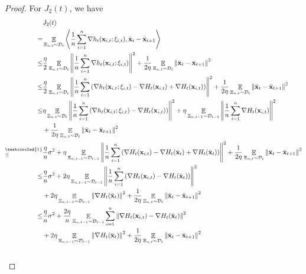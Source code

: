 \documentclass{article}
\begin{document}
\begin{proof}
For $J_2(t)$, we have
\begin{align}
\nonumber
& J_2(t) \\ \nonumber 
= & \EE_{ \Xi_{n,t} \sim \Dcal_{t} }\lrangle{\frac{1}{n}\sum_{i=1}^n\nabla h_t(\x_{i,t};\xi_{i,t}), \bar{\x}_t - \bar{\x}_{t+1} } \\ \nonumber
\le & \frac{\eta}{2}\EE_{ \Xi_{n,t} \sim \Dcal_{t} } \lrnorm{\frac{1}{n}\sum_{i=1}^n \nabla h_t(\x_{i,t};\xi_{i,t})}^2 + \frac{1}{2\eta} \EE_{ \Xi_{n,t} \sim \Dcal_{t} }\lrnorm{ \bar{\x}_t - \bar{\x}_{t+1}}^2  \\ \nonumber
\le & \frac{\eta}{2}\EE_{ \Xi_{n,t} \sim \Dcal_{t} }\lrnorm{\frac{1}{n}\sum_{i=1}^n \lrincir{\nabla  h_t(\x_{i,t};\xi_{i,t}) - \nabla H_t(\x_{i,t}) + \nabla H_t(\x_{i,t})} }^2 + \frac{1}{2\eta} \EE_{ \Xi_{n,t} \sim \Dcal_{t} }\lrnorm{ \bar{\x}_t - \bar{\x}_{t+1}}^2  \\ \nonumber
\le &  \eta\EE_{ \Xi_{n,t} \sim \Dcal_{t} }\lrnorm{\frac{1}{n}\sum_{i=1}^n \lrincir{ \nabla h_t(\x_{i,t};\xi_{i,t}) - \nabla H_t(\x_{i,t}) } }^2 + \eta \EE_{ \Xi_{n,t-1} \sim \Dcal_{t-1} }\lrnorm{\frac{1}{n}\sum_{i=1}^n\nabla H_t(\x_{i,t})}^2 \\ \nonumber 
& + \frac{1}{2\eta} \EE_{ \Xi_{n,t} \sim \Dcal_{t} }\lrnorm{ \bar{\x}_t - \bar{\x}_{t+1}}^2  \\ \nonumber
\refabovecir{\le}{\textcircled{1}} & \frac{\eta}{n} \sigma^2 + \eta \EE_{ \Xi_{n,t-1} \sim \Dcal_{t-1} }\lrnorm{ \frac{1}{n}\sum_{i=1}^n \lrincir{ \nabla H_t(\x_{i,t}) - \nabla H_t(\bar{\x}_t) + \nabla H_t(\bar{\x}_t) } }^2 + \frac{1}{2\eta} \EE_{ \Xi_{n,t} \sim \Dcal_{t} }\lrnorm{ \bar{\x}_t - \bar{\x}_{t+1}}^2 \\ \nonumber
\le & \frac{\eta}{n} \sigma^2 + 2\eta \EE_{ \Xi_{n,t-1} \sim \Dcal_{t-1} }\lrnorm{\frac{1}{n}\sum_{i=1}^n \lrincir{ \nabla H_t(\x_{i,t}) - \nabla H_t(\bar{\x}_t) } }^2 \\ \nonumber 
& + 2\eta \EE_{ \Xi_{n,t-1} \sim \Dcal_{t-1} }\lrnorm{\nabla H_t(\bar{\x}_t)}^2 + \frac{1}{2\eta} \EE_{ \Xi_{n,t} \sim \Dcal_{t} }\lrnorm{ \bar{\x}_t - \bar{\x}_{t+1}}^2 \\ \nonumber
\le & \frac{\eta}{n} \sigma^2 + \frac{2\eta}{n} \EE_{ \Xi_{n,t-1} \sim \Dcal_{t-1} }\sum_{i=1}^n\lrnorm{ \nabla H_t(\x_{i,t}) - \nabla H_t(\bar{\x}_t)  }^2 \\ \nonumber 
& + 2\eta \EE_{ \Xi_{n,t-1} \sim \Dcal_{t-1} }\lrnorm{\nabla H_t(\bar{\x}_t)}^2 + \frac{1}{2\eta} \EE_{ \Xi_{n,t} \sim \Dcal_{t} }\lrnorm{ \bar{\x}_t - \bar{\x}_{t+1}}^2 \\ \nonumber

\end{align}
\end{proof}
\end{document}

